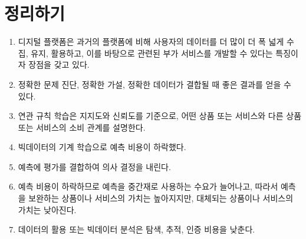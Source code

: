 \pagebreak

\section*{정리하기}
\begin{enumerate}
\item 디지털 플랫폼은 과거의 플랫폼에 비해 사용자의 데이터를 더 많이 더 폭 넓게 수집, 유지, 활용하고, 이를 바탕으로 관련된 부가 서비스를 개발할 수 있다는 특징이자 장점을 갖고 있다.
\item 정확한 문제 진단, 정확한 가설, 정확한 데이터가 결합될 때 좋은 결과를 얻을 수 있다.
\item 연관 규칙 학습은 지지도와 신뢰도를 기준으로, 어떤 상품 또는 서비스와 다른 상품 또는 서비스의 소비 관계를 설명한다.
\item 빅데이터의 기계 학습으로 예측 비용이 하락했다. 
\item 예측에 평가를 결합하여 의사 결정을 내린다.
\item 예측 비용이 하락하므로 예측을 중간재로 사용하는 수요가 늘어나고, 따라서 예측을 보완하는 상품이나 서비스의 가치는 높아지지만, 대체되는 상품이나 서비스의 가치는 낮아진다.
\item 데이터의 활용 또는 빅데이터 분석은 탐색, 추적, 인증 비용을 낮춘다.
\end{enumerate}